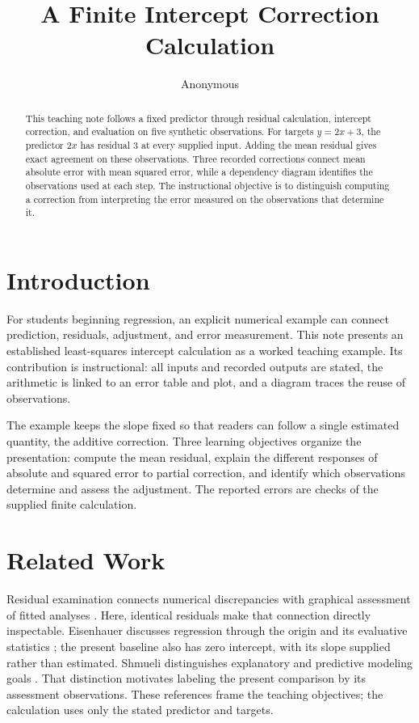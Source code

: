 \documentclass[11pt]{article}
\title{A Finite Intercept Correction Calculation}
\author{Anonymous}
\date{}
\begin{document}
\maketitle

\begin{abstract}
This teaching note follows a fixed predictor through residual calculation, intercept correction, and evaluation on five synthetic observations. For targets $y=2x+3$, the predictor $2x$ has residual $3$ at every supplied input. Adding the mean residual gives exact agreement on these observations. Three recorded corrections connect mean absolute error with mean squared error, while a dependency diagram identifies the observations used at each step. The instructional objective is to distinguish computing a correction from interpreting the error measured on the observations that determine it.
\end{abstract}

\section{Introduction}

For students beginning regression, an explicit numerical example can connect prediction, residuals, adjustment, and error measurement. This note presents an established least-squares intercept calculation as a worked teaching example. Its contribution is instructional: all inputs and recorded outputs are stated, the arithmetic is linked to an error table and plot, and a diagram traces the reuse of observations.

The example keeps the slope fixed so that readers can follow a single estimated quantity, the additive correction. Three learning objectives organize the presentation: compute the mean residual, explain the different responses of absolute and squared error to partial correction, and identify which observations determine and assess the adjustment. The reported errors are checks of the supplied finite calculation.

\section{Related Work}

Residual examination connects numerical discrepancies with graphical assessment of fitted analyses \cite{Anscombe1963ExaminationAnalysis}. Here, identical residuals make that connection directly inspectable. Eisenhauer discusses regression through the origin and its evaluative statistics \cite{Eisenhauer2003RegressionThrough}; the present baseline also has zero intercept, with its slope supplied rather than estimated. Shmueli distinguishes explanatory and predictive modeling goals \cite{Shmueli2010ExplainOr}. That distinction motivates labeling the present comparison by its assessment observations. These references frame the teaching objectives; the calculation uses only the stated predictor and targets.
\end{document}
